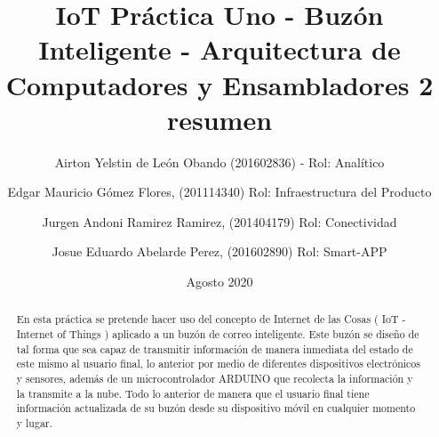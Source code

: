 \documentclass[osajnl,twocolumn,showpacs,superscriptaddress,10pt]{revtex4-1}
\begin{document}

\title{\Huge IoT Práctica Uno -  Buzón Inteligente - Arquitectura de Computadores y Ensambladores 2 }

\author{\newline Airton Yelstin de León Obando (201602836) - Rol: Analítico}
%

\author{\newline Edgar Mauricio Gómez Flores, (201114340) Rol: Infraestructura del Producto}%
%
\author{\newline Jurgen Andoni Ramirez Ramirez, (201404179) Rol: Conectividad}%
%
\author{\newline Josue Eduardo Abelarde Perez, (201602890) Rol: Smart-APP}%
%
\date{Agosto 2020}



\begin{abstract}
\title {resumen}
En esta pr\'actica se pretende hacer uso del concepto de Internet de las Cosas ( IoT - Internet of Things ) aplicado a un buz\'on de correo inteligente. Este buz\'on se diseño de tal forma que sea capaz de transmitir informaci\'on de manera inmediata del estado de este mismo al usuario final, lo anterior por medio de diferentes dispositivos electrónicos y sensores, adem\'as de un microcontrolador ARDUINO que recolecta la informaci\'on y la transmite a la nube. Todo lo anterior de manera que el usuario final tiene informaci\'on actualizada de su buz\'on desde su dispositivo m\'ovil en cualquier momento y lugar.
\end{abstract}
\maketitle{}
\end{document}
